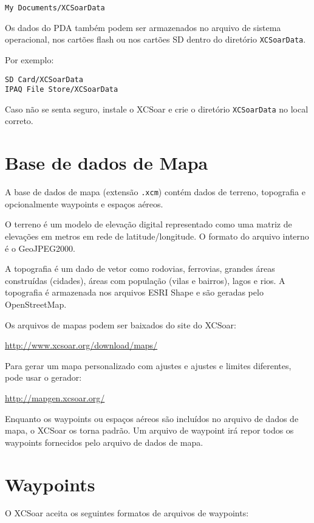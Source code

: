 \begin{verbatim}
My Documents/XCSoarData
\end{verbatim}

Os dados do PDA também podem ser armazenados no arquivo de sistema operacional, nos cartões flash ou nos cartões SD dentro do diretório 
\verb|XCSoarData|.

Por exemplo:
\begin{verbatim}
SD Card/XCSoarData
IPAQ File Store/XCSoarData
\end{verbatim}

Caso não se senta seguro, instale o XCSoar e crie o diretório  \verb|XCSoarData|
no local correto. 
 

\section{Base de dados de Mapa}\label{sec:map}

A base de dados de mapa (extensão  \verb|.xcm|) contém dados de terreno, topografia e opcionalmente waypoints e espaços aéreos.

O terreno é um modelo de elevação digital representado como uma matriz de elevações em metros em rede de latitude/longitude.  O formato do arquivo interno é o GeoJPEG2000.

A topografia é um dado de vetor como rodovias, ferrovias, grandes áreas construídas (cidades), áreas com população (vilas e bairros), lagos e rios.  A topografia é armazenada nos arquivos ESRI Shape e são geradas pelo OpenStreetMap.

Os arquivos de mapas podem ser baixados do site do XCSoar:


\url{http://www.xcsoar.org/download/maps/}

Para gerar um mapa personalizado com ajustes e ajustes e limites diferentes, pode usar o gerador:

\url{http://mapgen.xcsoar.org/}

Enquanto os waypoints ou espaços aéreos são incluídos no arquivo de dados de mapa, o XCSoar os torna padrão.  Um arquivo de waypoint irá repor todos os waypoints fornecidos pelo arquivo de dados de mapa.

\section{Waypoints}

O XCSoar aceita os seguintes formatos de arquivos de waypoints:

